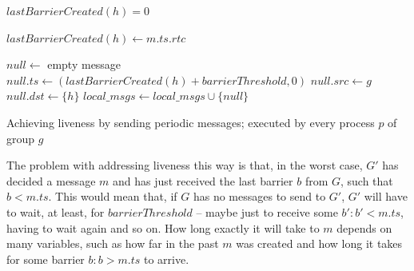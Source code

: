 \documentclass[times, 10pt]{article}
\begin{document}
\begin{algorithm}
\begin{distribalgo}[1]
\blankline
{}
    \STATE $lastBarrierCreated(h) = 0$
  \ENDINDENT
\ENDINDENT

\blankline
{}
  \STATE $lastBarrierCreated(h) \leftarrow m.ts.rtc$
\ENDINDENT

\blankline
{}
  \STATE $null \leftarrow$ empty message
  \STATE $null.ts \leftarrow (lastBarrierCreated(h) + barrierThreshold, 0)$ \label{algline:samenullid}
  \STATE $null.src \leftarrow g$
  \STATE $null.dst \leftarrow \{h\}$ 
  \STATE $local\_msgs \leftarrow local\_msgs \cup \{null\}$
\ENDINDENT 

\blankline
\caption{Achieving liveness by sending periodic messages; executed by every process $p$ of group $g$}
\label{algorithm:nullperiodic}
\end{distribalgo} 
\end{algorithm}

The problem with addressing liveness this way is that, in the worst case, $G'$ has decided a message $m$ and has just received the last barrier $b$ from $G$, such that $b < m.ts$. This would mean that, if $G$ has no messages to send to $G'$, $G'$ will have to wait, at least, for $barrierThreshold$ -- maybe just to receive some $b' : b' < m.ts$, having to wait again and so on. How long exactly it will take to \cons{} $m$ depends on many variables, such as how far in the past $m$ was created and how long it takes for some barrier $b: b > m.ts$ to arrive.%
\end{document}
